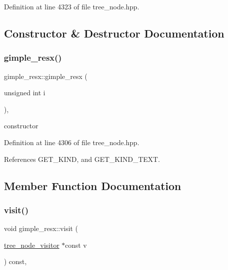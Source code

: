 Definition at line 4323 of file tree\+\_\+node.\+hpp.



\subsection{Constructor \& Destructor Documentation}
\mbox{\label{structgimple__resx_a308abb85c21f804773c5b07e4f8edee8}} 
\subsubsection{\texorpdfstring{gimple\+\_\+resx()}{gimple\_resx()}}
{\footnotesize\ttfamily gimple\+\_\+resx\+::gimple\+\_\+resx (\begin{DoxyParamCaption}\item[{unsigned int}]{i }\end{DoxyParamCaption})\hspace{0.3cm}{\ttfamily [inline]}, {\ttfamily [explicit]}}



constructor 



Definition at line 4306 of file tree\+\_\+node.\+hpp.



References G\+E\+T\+\_\+\+K\+I\+ND, and G\+E\+T\+\_\+\+K\+I\+N\+D\+\_\+\+T\+E\+XT.



\subsection{Member Function Documentation}
\mbox{\label{structgimple__resx_aeaec0bead312592457e09d043bc76fea}} 
\subsubsection{\texorpdfstring{visit()}{visit()}}
{\footnotesize\ttfamily void gimple\+\_\+resx\+::visit (\begin{DoxyParamCaption}\item[{\hyperlink{classtree__node__visitor}{tree\+\_\+node\+\_\+visitor} $\ast$const}]{v }\end{DoxyParamCaption}) const\hspace{0.3cm}{\ttfamily [override]}, {\ttfamily [virtual]}}



